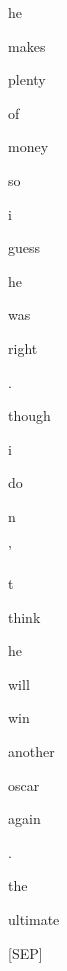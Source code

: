 \documentclass[varwidth=150mm]{standalone}
\begin{document}
\begin{CJK*}{UTF8}{gbsn}
{{{\colorbox{red!0.0}{\strut he} \colorbox{red!0.0}{\strut makes} \colorbox{red!0.0}{\strut plenty} \colorbox{red!0.0}{\strut of} \colorbox{red!1.3584399223327637}{\strut money} \colorbox{red!20.849525451660156}{\strut so} \colorbox{red!14.092042922973633}{\strut i} \colorbox{red!5.208878993988037}{\strut guess} \colorbox{red!0.0}{\strut he} \colorbox{red!1.2993301153182983}{\strut was} \colorbox{red!0.0}{\strut right} \colorbox{red!0.0}{\strut .} \colorbox{red!0.0}{\strut though} \colorbox{red!16.278459548950195}{\strut i} \colorbox{red!0.0}{\strut do} \colorbox{red!20.970346450805664}{\strut n} \colorbox{red!0.0}{\strut '} \colorbox{red!4.555819511413574}{\strut t} \colorbox{red!2.9365546703338623}{\strut think} \colorbox{red!0.0}{\strut he} \colorbox{red!2.37030029296875}{\strut will} \colorbox{red!3.5993459224700928}{\strut win} \colorbox{red!1.494823694229126}{\strut another} \colorbox{red!10.675909042358398}{\strut oscar} \colorbox{red!0.0}{\strut again} \colorbox{red!4.350476264953613}{\strut .} \colorbox{red!2.453805685043335}{\strut the} \colorbox{red!17.036468505859375}{\strut ultimate} \colorbox{red!0.0}{\strut [SEP]}
}}}
\end{CJK*}
\end{document}

